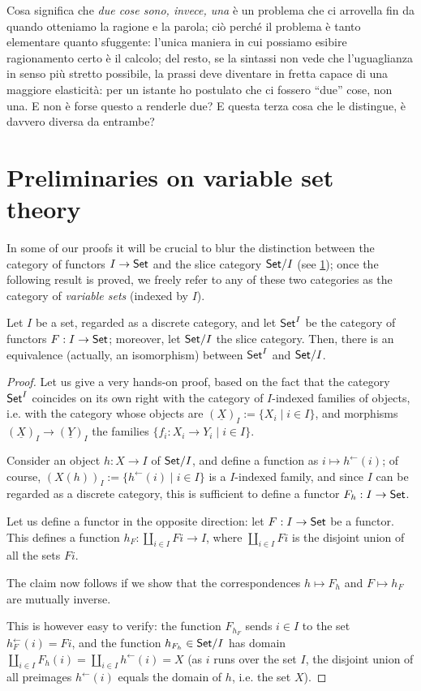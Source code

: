 \documentclass{amsart}
\begin{document}
Cosa significa che \emph{due cose sono, invece, una} è un problema che ci arrovella fin da quando otteniamo la ragione e la parola; ciò perché il problema è tanto elementare quanto sfuggente: l'unica maniera in cui possiamo esibire ragionamento certo è il calcolo; del resto, se la sintassi non vede che l'uguaglianza in senso più stretto possibile, la prassi deve diventare in fretta capace di una maggiore elasticità: per un istante ho postulato che ci fossero ``due'' cose, non una. E non è forse questo a renderle due? E questa terza cosa che le distingue, è davvero diversa da entrambe?
\section{Preliminaries on variable set theory}
In some of our proofs it will be crucial to blur the distinction between the category of functors $I \to \mathsf{Set}$ and the slice category $\mathsf{Set}/I$ (see \ref{}); once the following result is proved, we freely refer to any of these two categories as the category of \emph{variable sets} (indexed by $I$).
\begin{proposition}
Let $I$ be a set, regarded as a discrete category, and let $\mathsf{Set}^I$ be the category of functors $F : I \to \mathsf{Set}$; moreover, let $\mathsf{Set}/I$ the slice category. Then, there is an equivalence (actually, an isomorphism) between $\mathsf{Set}^I$ and $\mathsf{Set}/I$.
\end{proposition}
\begin{proof}
  Let us give a very hands-on proof, based on the fact that the category $\mathsf{Set}^I$ coincides on its own right with the category of $I$-indexed families of objects, i.e. with the category whose objects are $(\underline X)_I := \{X_i\mid i\in I\}$, and morphisms $(\underline X)_I\to (\underline Y)_I$ the families $\{f_i : X_i \to Y_i\mid i \in I\}$. 
  
  Consider an object $h : X\to I$ of $\mathsf{Set}/I$, and define a function as $i\mapsto h^\leftarrow(i)$; of course, $(X(h))_I := \{h^\leftarrow(i) \mid i \in I\}$ is a $I$-indexed family, and since $I$ can be regarded as a discrete category, this is sufficient to define a functor $F_h : I \to \mathsf{Set}$.

  Let us define a functor in the opposite direction: let $F : I \to \mathsf{Set}$ be a functor. This defines a function $h_F : \coprod_{i\in I}Fi \to I$, where $\coprod_{i\in I} Fi$ is the disjoint union of all the sets $Fi$.

  The claim now follows if we show that the correspondences $h\mapsto F_h$ and $F\mapsto h_F$ are mutually inverse.

  This is however easy to verify: the function $F_{h_F}$ sends $i\in I$ to the set $h_F^\leftarrow(i)=Fi$, and the function $h_{F_h} \in \mathsf{Set}/I$ has domain $\coprod_{i\in I}F_h(i) = \coprod_{i\in I}h^\leftarrow(i)=X$ (as $i$ runs over the set $I$, the disjoint union of all preimages $h^\leftarrow(i)$ equals the domain of $h$, i.e. the set $X$).
\end{proof}
\end{document}
